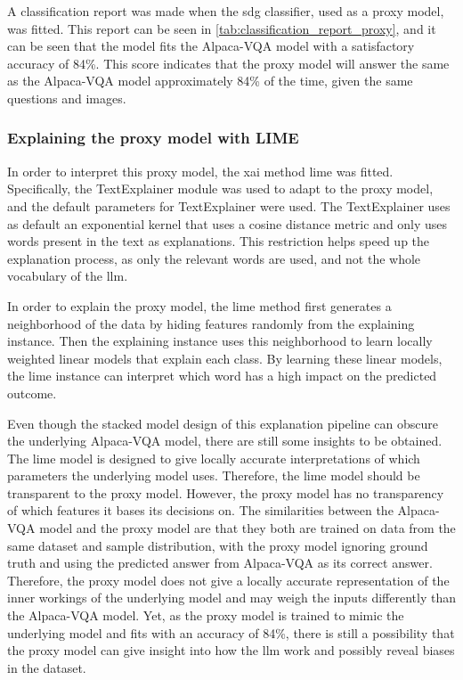     A classification report was made when the \gls{sdg} classifier, used as a proxy model, was fitted. This report can be seen in \autoref{tab:classification_report_proxy}, and it can be seen that the model fits the Alpaca-VQA model with a satisfactory accuracy of 84\%. This score indicates that the proxy model will answer the same as the Alpaca-VQA model approximately 84\% of the time, given the same questions and images.

    


    \subsubsection{Explaining the proxy model with LIME}
    
    In order to interpret this proxy model, the \gls{xai} method \gls{lime} was fitted. Specifically, the TextExplainer module \cite{LimePackageLime} was used to adapt to the proxy model, and the default parameters for TextExplainer were used. The TextExplainer uses as default an exponential kernel that uses a cosine distance metric and only uses words present in the text as explanations. This restriction helps speed up the explanation process, as only the relevant words are used, and not the whole vocabulary of the \gls{llm}. 

    In order to explain the proxy model, the \gls{lime} method first generates a neighborhood of the data by hiding features randomly from the explaining instance. Then the explaining instance uses this neighborhood to learn locally weighted linear models that explain each class. By learning these linear models, the \gls{lime} instance can interpret which word has a high impact on the predicted outcome. 
    
    
    Even though the stacked model design of this explanation pipeline can obscure the underlying Alpaca-VQA model, there are still some insights to be obtained. The \gls{lime} model is designed to give locally accurate interpretations of which parameters the underlying model uses. Therefore, the \gls{lime} model should be transparent to the proxy model. However, the proxy model has no transparency of which features it bases its decisions on. 
    The similarities between the Alpaca-VQA model and the proxy model are that they both are trained on data from the same dataset and sample distribution, with the proxy model ignoring ground truth and using the predicted answer from Alpaca-VQA as its correct answer. 
    Therefore, the proxy model does not give a locally accurate representation of the inner workings of the underlying model and may weigh the inputs differently than the Alpaca-VQA model. 
    Yet, as the proxy model is trained to mimic the underlying model and fits with an accuracy of 84\%, there is still a possibility that the proxy model can give insight into how the \gls{llm} work and possibly reveal biases in the dataset.

